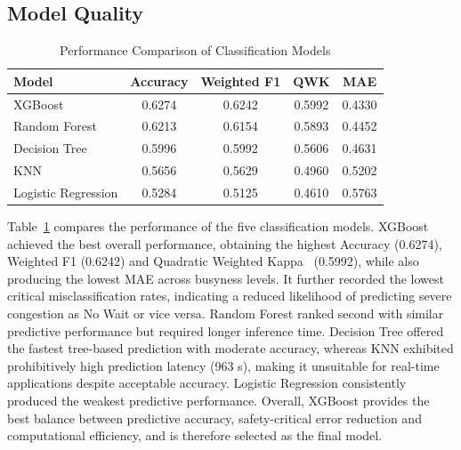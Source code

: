 \documentclass[conference]{IEEEtran}
\begin{document}
\subsection{Model Quality}

\begin{table}[htbp]
    \centering
    \caption{Performance Comparison of Classification Models}
    \label{tab:model_comparison}

    \begin{tabular}{lcccc}
        \toprule
        Model &
        Accuracy &
        Weighted F1 &
        QWK &
        MAE \\
        \midrule

        XGBoost
        & 0.6274
        & 0.6242
        & 0.5992
        & 0.4330 \\

        Random Forest
        & 0.6213
        & 0.6154
        & 0.5893
        & 0.4452 \\

        Decision Tree
        & 0.5996
        & 0.5992
        & 0.5606
        & 0.4631 \\

        KNN
        & 0.5656
        & 0.5629
        & 0.4960
        & 0.5202 \\

        Logistic Regression
        & 0.5284
        & 0.5125
        & 0.4610
        & 0.5763  \\

        \bottomrule
    \end{tabular}
\end{table}

Table~\ref{tab:model_comparison} compares the performance of the five classification models. XGBoost achieved the best overall performance, obtaining the highest Accuracy (0.6274), Weighted F1 (0.6242) and Quadratic Weighted Kappa~\cite{cohen1968weighted} (0.5992), while also producing the lowest MAE across busyness levels. It further recorded the lowest critical misclassification rates, indicating a reduced likelihood of predicting severe congestion as No Wait or vice versa. Random Forest ranked second with similar predictive performance but required longer inference time. Decision Tree offered the fastest tree-based prediction with moderate accuracy, whereas KNN exhibited prohibitively high prediction latency (963 s), making it unsuitable for real-time applications despite acceptable accuracy. Logistic Regression consistently produced the weakest predictive performance. Overall, XGBoost provides the best balance between predictive accuracy, safety-critical error reduction and computational efficiency, and is therefore selected as the final model.
\end{document}
